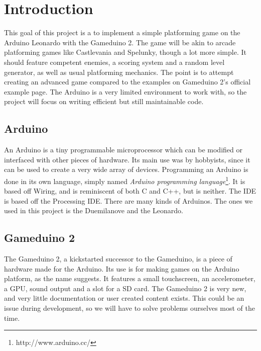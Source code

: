 \chapter{Introduction}
This goal of this project is a to implement a simple platforming game on the Arduino Leonardo with the Gameduino 2. The game will be akin to arcade platforming games like Castlevania and Spelunky, though a lot more simple. It should feature competent enemies, a scoring system and a random level generator, as well as usual platforming mechanics.
\newline
The point is to attempt creating an advanced game compared to the examples on Gameduino 2's official example page. The Arduino is a very limited environment to work with, so the project will focus on writing efficient but still maintainable code.

\section{Arduino} %
An Arduino is a tiny programmable microprocessor which can be modified or interfaced with other pieces of hardware. Its main use was by hobbyists, since it can be used to create a very wide array of devices. Programming an Arduino is done in its own language, simply named \emph{Arduino programming language}\footnote{http://www.arduino.cc/}. It is based off Wiring, and is reminiscent of both C and C++, but is neither. The IDE is based off the Processing IDE. There are many kinds of Arduinos. The ones we used in this project is the Duemilanove and the Leonardo.

\section{Gameduino 2}
The Gameduino 2, a kickstarted successor to the Gameduino, is a piece of hardware made for the Arduino. Its use is for making games on the Arduino platform, as the name suggests. It features a small touchscreen, an accelerometer, a GPU, sound output and a slot for a SD card.
\newline
The Gameduino 2 is very new, and very little documentation or user created content exists. This could be an issue during development, so we will have to solve problems ourselves most of the time.